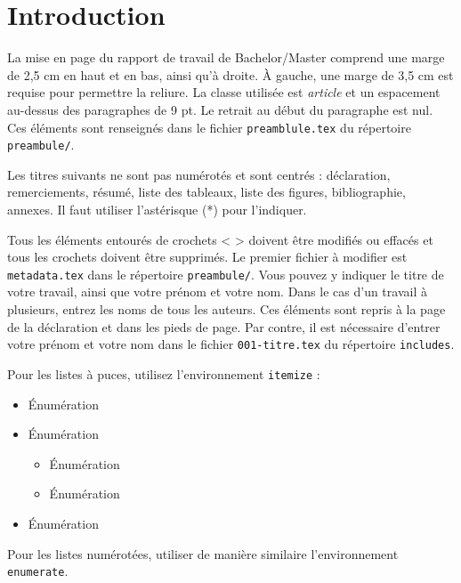 

\section{Introduction}

La mise en page du rapport de travail de Bachelor/Master comprend une marge de 2,5 cm en haut et en bas, ainsi qu’à droite. À gauche, une marge de 3,5 cm est requise pour permettre la reliure. La classe utilisée est \emph{article} et un espacement au-dessus des paragraphes de 9 pt. Le retrait au début du paragraphe est nul. Ces éléments sont renseignés dans le fichier \texttt{preamblule.tex} du répertoire \texttt{preambule/}.

Les titres suivants ne sont pas numérotés et sont centrés : déclaration, remerciements, résumé, liste des tableaux, liste des figures, bibliographie, annexes. Il faut utiliser l'astérisque (*) pour l'indiquer.

Tous les éléments entourés de crochets < > doivent être modifiés ou effacés et tous les crochets doivent être supprimés. Le premier fichier à modifier est \texttt{metadata.tex} dans le répertoire \texttt{preambule/}. Vous pouvez y indiquer le titre de votre travail, ainsi que votre prénom et votre nom. Dans le cas d'un travail à plusieurs, entrez les noms de tous les auteurs. Ces éléments sont repris à la page de la déclaration et dans les pieds de page. Par contre, il est nécessaire d'entrer votre prénom et votre nom dans le fichier \texttt{001-titre.tex} du répertoire \texttt{includes}.

Pour les listes à puces, utilisez l'environnement \texttt{itemize} :

\begin{itemize}[itemsep=0pt]
	\item Énumération
	\item Énumération
	\begin{itemize}[itemsep=0pt]
		\item Énumération
		\item Énumération
	\end{itemize}
	\item Énumération
\end{itemize}

Pour les listes numérotées, utiliser de manière similaire l'environnement \texttt{enumerate}.

